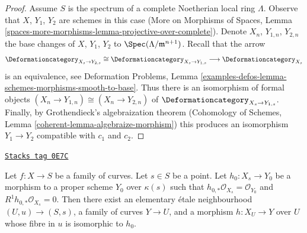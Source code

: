 \begin{proof}
\medskip\noindent
Assume $S$ is the spectrum of a complete Noetherian local ring $\Lambda$.
Observe that $X$, $Y_1$, $Y_2$ are schemes in this case
(More on Morphisms of Spaces, Lemma
\ref{spaces-more-morphisms-lemma-projective-over-complete}).
Denote $X_n$, $Y_{1, n}$, $Y_{2, n}$ the base changes of
$X$, $Y_1$, $Y_2$ to $\Spec(\Lambda/\mathfrak m^{n + 1})$.
Recall that the arrow
$$
\Deformationcategory_{X_s \to Y_{2, s}} \cong
\Deformationcategory_{X_s \to Y_{1, s}} \longrightarrow
\Deformationcategory_{X_s}
$$
is an equivalence, see Deformation Problems, Lemma
\ref{examples-defos-lemma-schemes-morphisms-smooth-to-base}.
Thus there is an isomorphism of formal objects
$(X_n \to Y_{1, n}) \cong (X_n \to Y_{2, n})$
of $\Deformationcategory_{X_s \to Y_{1, s}}$.
Finally, by Grothendieck's algebraization theorem
(Cohomology of Schemes, Lemma \ref{coherent-lemma-algebraize-morphism})
this produces an isomorphism $Y_1 \to Y_2$ compatible with $c_1$ and $c_2$.
\end{proof}

\begin{lemma}
\label{moduli-curves-lemma-contract-basic}
\href{https://stacks.math.columbia.edu/tag/0E7C}{\texttt{Stacks tag 0E7C}}

Let $f : X \to S$ be a family of curves. Let $s \in S$ be a point.
Let $h_0 : X_s \to Y_0$ be a morphism to a proper scheme $Y_0$ over $\kappa(s)$
such that $h_{0, *}\mathcal{O}_{X_s} = \mathcal{O}_{Y_0}$ and
$R^1h_{0, *}\mathcal{O}_{X_s} = 0$. Then there exist an elementary
\'etale neighbourhood $(U, u) \to (S, s)$, a family of curves $Y \to U$,
and a morphism $h : X_U \to Y$ over $U$ whose fibre in $u$
is isomorphic to $h_0$.
\end{lemma}

